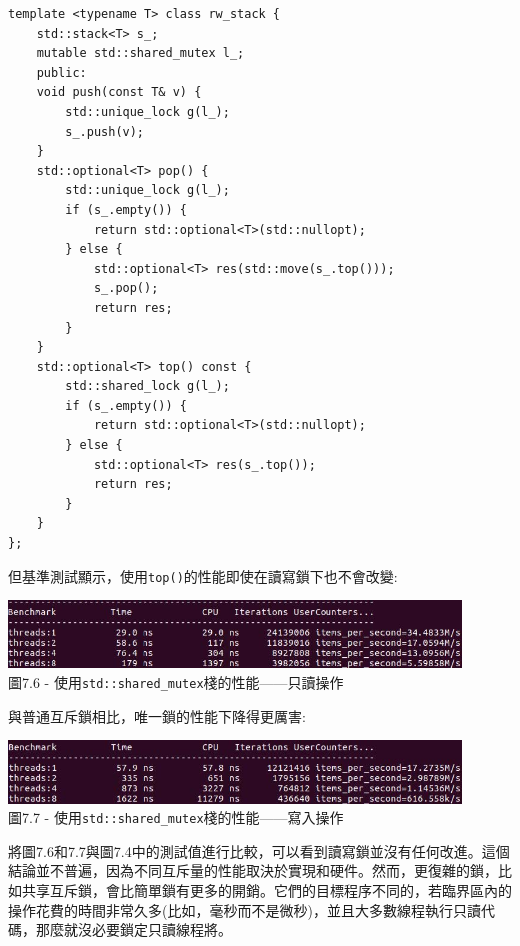 \begin{lstlisting}[style=styleCXX]
template <typename T> class rw_stack {
	std::stack<T> s_;
	mutable std::shared_mutex l_;
	public:
	void push(const T& v) {
		std::unique_lock g(l_);
		s_.push(v);
	}
	std::optional<T> pop() {
		std::unique_lock g(l_);
		if (s_.empty()) {
			return std::optional<T>(std::nullopt);
		} else {
			std::optional<T> res(std::move(s_.top()));
			s_.pop();
			return res;
		}
	}
	std::optional<T> top() const {
		std::shared_lock g(l_);
		if (s_.empty()) {
			return std::optional<T>(std::nullopt);
		} else {
			std::optional<T> res(s_.top());
			return res;
		}
	}
};
\end{lstlisting}

但基準測試顯示，使用\texttt{top()}的性能即使在讀寫鎖下也不會改變:

\begin{center}
\includegraphics[width=0.9\textwidth]{content/2/chapter7/images/6.jpg}\\
圖7.6 - 使用\texttt{std::shared\_mutex}棧的性能——只讀操作
\end{center}

與普通互斥鎖相比，唯一鎖的性能下降得更厲害:

\begin{center}
\includegraphics[width=0.9\textwidth]{content/2/chapter7/images/7.jpg}\\
圖7.7 - 使用\texttt{std::shared\_mutex}棧的性能——寫入操作
\end{center}

將圖7.6和7.7與圖7.4中的測試值進行比較，可以看到讀寫鎖並沒有任何改進。這個結論並不普遍，因為不同互斥量的性能取決於實現和硬件。然而，更復雜的鎖，比如共享互斥鎖，會比簡單鎖有更多的開銷。它們的目標程序不同的，若臨界區內的操作花費的時間非常久多(比如，毫秒而不是微秒)，並且大多數線程執行只讀代碼，那麼就沒必要鎖定只讀線程將。

